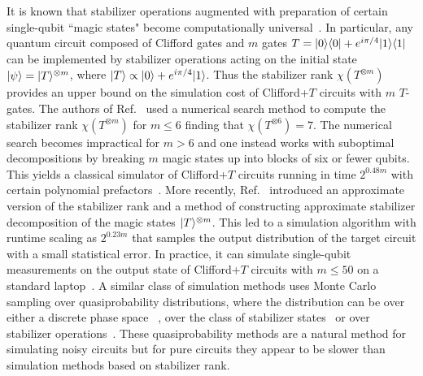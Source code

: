 It is known that stabilizer operations augmented with  preparation of certain
single-qubit ``magic states" become computationally universal~\cite{bravyi2005universal}.
In particular, any quantum circuit composed of Clifford gates
and $m$ gates $T=|0\rangle\langle 0|+e^{i\pi/4}|1\rangle\langle 1|$ can be implemented by
stabilizer operations acting on the initial state $|\psi\rangle =|T\rangle^{\otimes m}$,
where $|T\rangle \propto |0\rangle + e^{i\pi/4} |1\rangle$.
Thus the stabilizer rank  $\chi(T^{\otimes m})$ provides an upper bound on the simulation cost
of Clifford+$T$ circuits with $m$ $T$-gates.
The authors of  Ref.~\cite{Bravyi16stabRank} used a numerical search method to 
compute the stabilizer rank $\chi(T^{\otimes m})$ for $m\le 6$ finding that
$\chi(T^{\otimes 6})=7$. The numerical search  becomes impractical for
$m>6$ 
and one instead works with suboptimal decompositions by breaking $m$ magic states up into blocks of six or fewer qubits. This yields a classical simulator of Clifford+$T$ circuits running in time $2^{0.48 m}$ with certain polynomial prefactors~\cite{bravyi2016improved}.
More recently, Ref.~\cite{bravyi2016improved} introduced
an approximate version of the stabilizer rank and a method of constructing  approximate
stabilizer decomposition of the magic states $|T\rangle^{\otimes m}$. This led to a simulation algorithm with runtime scaling as $2^{0.23m}$
that  samples the output distribution of the target circuit with  a small statistical error.
In practice, it can simulate single-qubit measurements on the output state of Clifford+$T$ circuits with  $m\le 50$ on a standard laptop~\cite{bravyi2016improved}.  A similar class of simulation methods uses Monte Carlo sampling over quasiprobability distributions, where the distribution can be over either a discrete phase space ~\cite{veitch2012negative,pashayan15,Delfosse15rebits}, over the class of stabilizer states~\cite{Howard17robustness} or over stabilizer operations~\cite{OakRidge17}.  These quasiprobability methods are a natural method for simulating noisy circuits but for pure circuits they appear to be slower than simulation methods based on stabilizer rank.  

